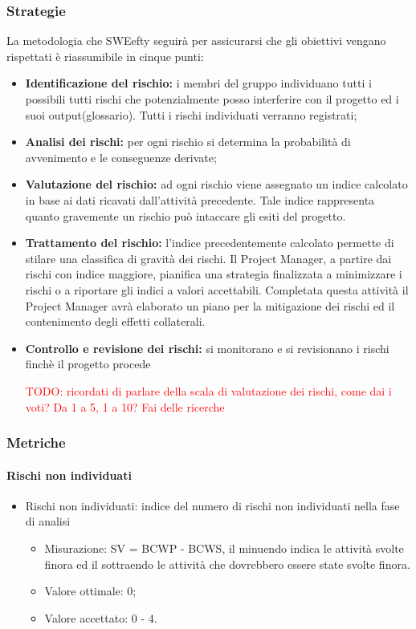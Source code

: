 \subsubsection{Strategie}
La metodologia che SWEefty seguirà per assicurarsi che gli obiettivi vengano rispettati è riassumibile in cinque punti:
\begin{itemize}
	\item \textbf{Identificazione del rischio:} i membri del gruppo individuano tutti i possibili tutti rischi che potenzialmente posso interferire con il progetto ed i suoi output(glossario). Tutti i rischi individuati verranno registrati;

	\item \textbf{Analisi dei rischi: } per ogni rischio si determina la probabilità di avvenimento e le conseguenze derivate;

	\item \textbf{Valutazione del rischio: } ad ogni rischio viene assegnato un indice calcolato in base ai dati ricavati dall'attività precedente. Tale indice rappresenta quanto gravemente un rischio può intaccare gli esiti del progetto.

	\item \textbf{Trattamento del rischio: } l'indice precedentemente calcolato permette di stilare una classifica di gravità dei rischi. Il Project Manager, a partire dai rischi con indice maggiore, pianifica una strategia finalizzata a minimizzare i rischi o a riportare gli indici a valori accettabili. Completata questa attività il Project Manager avrà elaborato un piano per la mitigazione dei rischi ed il contenimento degli effetti collaterali.

	\item \textbf{Controllo e revisione dei rischi: } si monitorano e si revisionano i rischi finchè il progetto procede

	\textcolor{red} {TODO: ricordati di parlare della scala di valutazione dei rischi, come dai i voti? Da 1 a 5, 1 a 10? Fai delle ricerche}
\end{itemize}
\subsubsection{Metriche}
\paragraph{Rischi non individuati}
\begin{itemize}
	\item Rischi non individuati: indice del numero di rischi non individuati nella fase di analisi
	\begin{itemize}
		\item Misurazione: SV = BCWP - BCWS, il minuendo indica le attività svolte finora ed il sottraendo le attività che dovrebbero essere state svolte finora.
		\item Valore ottimale: 0;
		\item Valore accettato: 0 - 4.
	\end{itemize}
\end{itemize}

